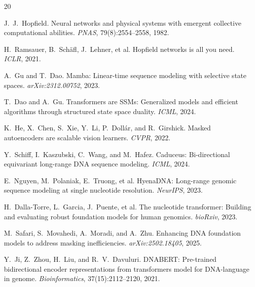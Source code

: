\documentclass[11pt,a4paper]{article}
\numberwithin{equation}{section}
\begin{document}
\medskip
\begin{thebibliography}{20}
\small

J.\ J.\ Hopfield.
\newblock Neural networks and physical systems with emergent collective
computational abilities.
\newblock \textit{PNAS}, 79(8):2554--2558, 1982.

H.\ Ramsauer, B.\ Sch\"afl, J.\ Lehner, et al.
\newblock Hopfield networks is all you need.
\newblock \textit{ICLR}, 2021.

A.\ Gu and T.\ Dao.
\newblock Mamba: Linear-time sequence modeling with selective state spaces.
\newblock \textit{arXiv:2312.00752}, 2023.

T.\ Dao and A.\ Gu.
\newblock Transformers are SSMs: Generalized models and efficient algorithms
through structured state space duality.
\newblock \textit{ICML}, 2024.

K.\ He, X.\ Chen, S.\ Xie, Y.\ Li, P.\ Doll\'ar, and R.\ Girshick.
\newblock Masked autoencoders are scalable vision learners.
\newblock \textit{CVPR}, 2022.

Y.\ Schiff, I.\ Kaszubski, C.\ Wang, and M.\ Hafez.
\newblock Caduceus: Bi-directional equivariant long-range DNA sequence modeling.
\newblock \textit{ICML}, 2024.

E.\ Nguyen, M.\ Polaniak, E.\ Truong, et al.
\newblock HyenaDNA: Long-range genomic sequence modeling at single nucleotide
resolution.
\newblock \textit{NeurIPS}, 2023.

H.\ Dalla-Torre, L.\ Garcia, J.\ Puente, et al.
\newblock The nucleotide transformer: Building and evaluating robust foundation
models for human genomics.
\newblock \textit{bioRxiv}, 2023.

M.\ Safari, S.\ Movahedi, A.\ Moradi, and A.\ Zhu.
\newblock Enhancing DNA foundation models to address masking inefficiencies.
\newblock \textit{arXiv:2502.18405}, 2025.

Y.\ Ji, Z.\ Zhou, H.\ Liu, and R.\ V.\ Davuluri.
\newblock DNABERT: Pre-trained bidirectional encoder representations from
transformers model for DNA-language in genome.
\newblock \textit{Bioinformatics}, 37(15):2112--2120, 2021.


\end{thebibliography}
\end{document}
